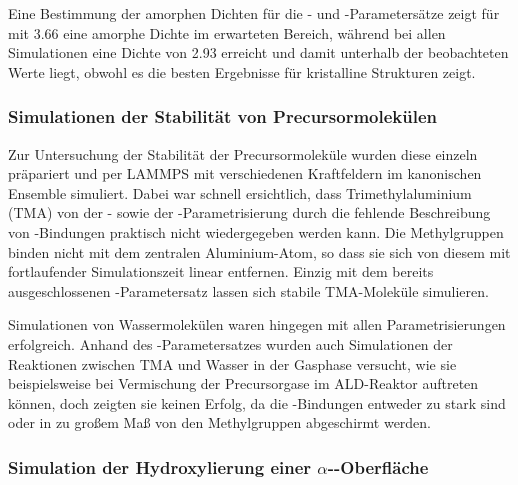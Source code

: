 Eine Bestimmung der amorphen Dichten für die - und -Parametersätze zeigt für  mit \SI{3.66}{\gpcc} eine amorphe Dichte im erwarteten Bereich, während  bei allen Simulationen eine Dichte von \SI{2.93}{\gpcc} erreicht und damit unterhalb der beobachteten Werte liegt, obwohl es die besten Ergebnisse für kristalline Strukturen zeigt.

\subsubsection{Simulationen der Stabilität von Precursormolekülen}

Zur Untersuchung der Stabilität der Precursormoleküle wurden diese einzeln präpariert und per LAMMPS mit verschiedenen Kraftfeldern im kanonischen Ensemble simuliert.
Dabei war schnell ersichtlich, dass Trimethylaluminium (TMA) von der - sowie der -Para\-metr\-isierung durch die fehlende Beschreibung von -Bindungen praktisch nicht wiedergegeben werden kann.
Die Methylgruppen binden nicht mit dem zentralen Aluminium-Atom, so dass sie sich von diesem mit fortlaufender Simulationszeit linear entfernen.
Einzig mit dem bereits ausgeschlossenen -Parametersatz lassen sich stabile TMA-Moleküle simulieren.

Simulationen von Wassermolekülen waren hingegen mit allen Parametrisierungen erfolgreich.
Anhand des -Parametersatzes wurden auch Simulationen der Reaktionen zwischen TMA und Wasser in der Gasphase versucht, wie sie beispielsweise bei Vermischung der Precursorgase im ALD-Reaktor auftreten können, doch zeigten sie keinen Erfolg, da die -Bindungen entweder zu stark sind oder in zu großem Maß von den Methylgruppen abgeschirmt werden.

\subsubsection{Simulation der Hydroxylierung einer $\alpha$--Oberfläche}

